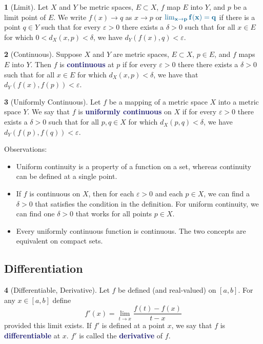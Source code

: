 \documentclass[12pt]{article}
\numberwithin{equation}{section}
\newcommand{\navy}[1]{\textcolor{MidnightBlue}{\bf #1}}
\theoremstyle{plain}
\theoremstyle{definition}
\newtheorem{definition}{\color{MidnightBlue}{\textbf{Definition}}}[section]
\newcommand{\1}{\mathbbm 1}
\def\d{\delta}
\newcommand{\e}{\varepsilon}
\begin{document}
\begin{definition}[Limit]
	Let $X$ and $Y$ be metric spaces, $E \subset X$, $f$ map $E$ into $Y$, and $p$ be a limit point of $E$. We write $f(x) \to q$ as $x \to p$ or $\navy{\lim_{x\to p} f(x) = q}$ if there is a point $q \in Y$ such that for every $\e > 0$ there exists a $\d > 0$ such that for all $x \in E$ for which $0 < d_X(x,p) < \d$, we have $d_Y(f(x),q) < \e$. 
\end{definition}

\begin{definition}[Continuous]
	Suppose $X$ and $Y$ are metric spaces, $E \subset X$, $p \in E$, and $f$ maps $E$ into $Y$. Then $f$ is \navy{continuous} at $p$ if for every $\e > 0$ there there exists a $\d > 0$ such that for all $x \in E$ for which $d_X(x,p) < \d$, we have that $d_Y(f(x), f(p)) < \e$. 
\end{definition}

\begin{definition}[Uniformly Continuous]
	Let $f$ be a mapping of a metric space $X$ into a metric space $Y$. We say that $f$ is \navy{uniformly continuous} on $X$ if for every $\e > 0$ there exists a $\d > 0$ such that for all $p,q \in X$ for which $d_X(p,q) < \delta$, we have $d_Y(f(p),f(q)) < \e$. 
\end{definition}

Observations:
\begin{itemize}
	\item Uniform continuity is a property of a function on a set, whereas continuity can be defined at a single point. 
	\item If $f$ is continuous on $X$, then for each $\e > 0$ and each $p \in X$, we can find a $\d > 0$ that satisfies the condition in the definition. For uniform continuity, we can find one $\d > 0$ that works for all points $p \in X$. 
	\item Every uniformly continuous function is continuous. The two concepts are equivalent on compact sets. 
\end{itemize}

\subsection{Differentiation}

\begin{definition}[Differentiable, Derivative]
	Let $f$ be defined (and real-valued) on $[a,b]$. For any $x \in [a,b]$ define
	\begin{equation}
		f'(x) = \lim_{t \to x} \frac{f(t) - f(x)}{t - x}
	\end{equation}
	provided this limit exists. If $f'$ is defined at a point $x$, we say that $f$ is \navy{differentiable} at $x$. $f'$ is called the \navy{derivative} of $f$.  
\end{definition}
\end{document}
